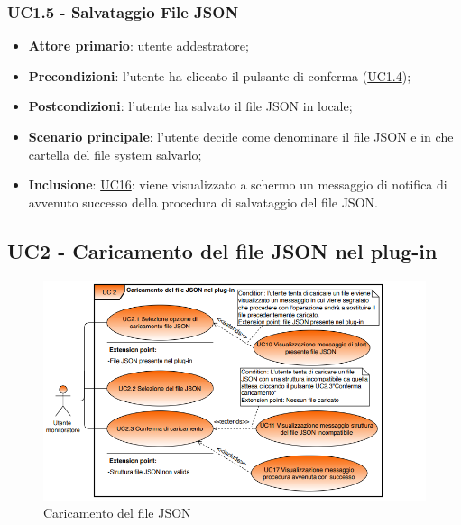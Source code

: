 	\subsubsection{UC1.5 - Salvataggio File JSON}
		\begin{itemize}
			\item\textbf{Attore primario}: utente addestratore;
			\item\textbf{Precondizioni}: l’utente ha cliccato il pulsante di conferma (\hyperref[par:UC1.4]{UC1.4});
			\item\textbf{Postcondizioni}: l’utente ha salvato il file JSON in locale;
			\item\textbf{Scenario principale}: l’utente decide come denominare il file JSON e in che cartella del file system salvarlo;  
			\item\textbf{Inclusione}: \hyperref[par:UC16]{UC16}: viene visualizzato a schermo un messaggio di notifica di avvenuto successo della procedura di salvataggio del file JSON.			
		\end{itemize}


	\label{par:UC2}
	\subsection{UC2 - Caricamento del file JSON nel plug-in}
	
	\begin{figure}[H]
		\centering
		\includegraphics[scale=0.70]{../Analisi_dei_requisiti/img/Diagrammi_UML/UC2_Caricamento_file_JSON_nel_plug-in.png}
		\caption{Caricamento del file JSON}
	\end{figure}	
		
